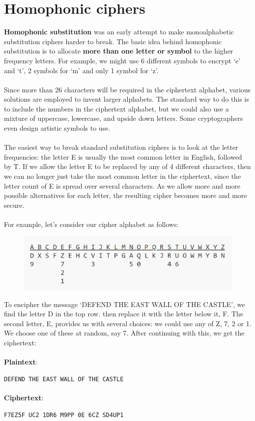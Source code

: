 \documentclass[Lau,binding=0.6cm,oneside]{sapthesis}
\begin{document}
\section{Homophonic ciphers}
\textbf{Homophonic substitution} was an early attempt to make monoalphabetic substitution ciphers harder to break. The basic idea behind homophonic substitution is to allocate \textbf{more than one letter or symbol} to the higher frequency letters. For example, we might use 6 different symbols to encrypt `e' and `t', 2 symbols for `m' and only 1 symbol for `z'.\\\\
Since more than 26 characters will be required in the ciphertext alphabet, various solutions are employed to invent larger alphabets. The standard way to do this is to include the numbers in the ciphertext alphabet, but we could also use a mixture of uppercase, lowercase, and upside down letters. Some cryptographers even design artistic symbols to use.\\\\
The easiest way to break standard substitution ciphers is to look at the letter frequencies: the letter E is usually the most common letter in English, followed by T. If we allow the letter E to be replaced by any of 4 different characters, then we can no longer just take the most common letter in the ciphertext, since the letter count of E is spread over several characters. As we allow more and more possible alternatives for each letter, the resulting cipher becomes more and more secure.\\\\
For example, let's consider our cipher alphabet as follows:

\begin{figure}[H]
\includegraphics[scale=0.4]{homophonic_cipher}
\centering
\caption{}
\centering
\end{figure}

To encipher the message `DEFEND THE EAST WALL OF THE CASTLE', we find the letter D in the top row. then replace it with the letter below it, F. The second letter, E, provides us with several choices: we could use any of Z, 7, 2 or 1. We choose one of these at random, say 7. After continuing with this, we get the ciphertext:\\
\ \\
\textbf{Plaintext}: \par\colorbox{gray!12}{\small{\texttt{DEFEND THE EAST WALL OF THE CASTLE}}}\\\\
\textbf{Ciphertext}: \par\colorbox{gray!12}{\small{\texttt{F7EZ5F UC2 1DR6 M9PP 0E 6CZ SD4UP1}}}\\
\end{document}
